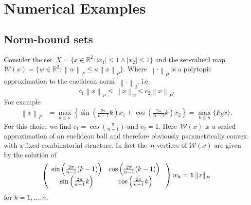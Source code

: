 \documentclass[smallextended]{svjour3}       %
\numberwithin{equation}{section}
\providecommand{\norm}[1]{\left\|#1\right\|}
\providecommand{\abs}[1]{\left|#1\right|}
\begin{document}
\section{Numerical Examples}\label{sec:numerical:examples}
\subsection{Norm-bound sets}\label{ssec:example:one}
%
Consider the set~$X = \{x\in\mathbb R^2: \abs{x_1}\leq 1\wedge \abs{x_2}\leq 1\}$ and the set-valued map $\mathcal W(x) = \{w\in\mathbb R^2: \norm{w}_P\leq\kappa\norm{x}_P\}$.
%
Where $\norm{\cdot}_P$ is a polytopic approximation to the euclidean norm~$\norm{\cdot}_2$, i.e.
%
$$
c_1 \norm{x}_P\leq\norm{x}_2\leq c_2\norm{x}_P.
$$
%
For example
%
$$\begin{aligned}
\norm{x}_P &= \max_{k\leq n}\left\{\sin\left(\frac{2\pi}{n-1}k\right) x_1 + \cos\left(\frac{2\pi}{n-1}k\right) x_2\right\} = \max_{k\leq n}\{F_k x\}.
\end{aligned}$$
%
For this choice we find $c_1 = \cos\left(\frac{\pi}{n-1}\right)$ and $c_2=1$.
%
Here~$\mathcal W(x)$ is a scaled approximation of an euclidean ball and therefore obviously parametrically convex with a fixed combinatorial structure.
%
In fact the~$n$ vertices of $\mathcal W(x)$ are  given by the solution of
%
$$
  \left(\begin{array}{cc}
  \sin\left(\frac{2\pi}{n-1}(k-1)\right) & \cos\left(\frac{2\pi}{n-1}(k-1)\right) \\
  \sin\left(\frac{2\pi}{n-1}k\right) & \cos\left(\frac{2\pi}{n-1}k\right)
  \end{array}
  \right) w_k = {\bf{1}}\norm{x}_P
$$
%
for $k=1,\dots,n$.
\end{document}
